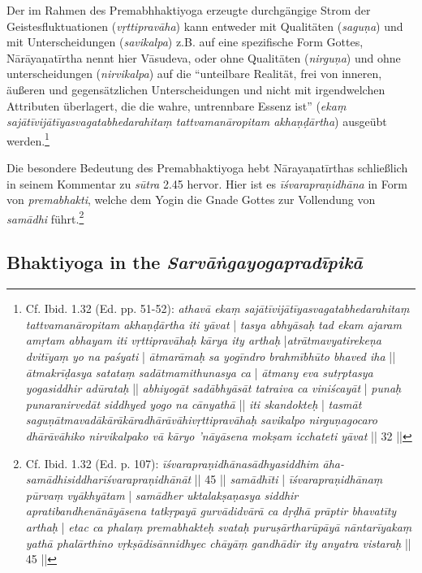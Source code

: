 Der im Rahmen des Premabhhaktiyoga erzeugte durchgängige Strom der Geistesfluktuationen (\textit{vṛttipravāha}) kann entweder mit Qualitäten (\textit{saguṇa}) und mit Unterscheidungen (\textit{savikalpa}) z.B. auf eine spezifische Form Gottes, Nārāyaṇatīrtha nennt hier Vāsudeva, oder ohne Qualitäten (\textit{nirguṇa}) und ohne unterscheidungen (\textit{nirvikalpa}) auf die ``unteilbare Realität, frei von inneren, äußeren und gegensätzlichen Unterscheidungen und nicht mit irgendwelchen Attributen überlagert, die die wahre, untrennbare Essenz ist'' (\textit{ekaṃ sajātīvijātīyasvagatabhedarahitaṃ tattvamanāropitam akhaṇḍārtha}) ausgeübt werden.\footnote{Cf. Ibid. 1.32 (Ed. pp. 51-52): \textit{athavā ekaṃ sajātīvijātīyasvagatabhedarahitaṃ tattvamanāropitam akhaṇḍārtha iti yāvat} | \textit{tasya abhyāsaḥ tad ekam ajaram amṛtam abhayam iti vṛttipravāhaḥ kārya ity arthaḥ} |\textit{atrātmavyatirekeṇa dvitīyaṃ yo na paśyati} | \textit{ātmarāmaḥ sa yogīndro brahmībhūto bhaved iha} || \textit{ātmakrīḍasya satataṃ sadātmamithunasya ca} | \textit{ātmany eva sutṛptasya yogasiddhir adūrataḥ} || \textit{abhiyogāt sadābhyāsāt tatraiva ca viniścayāt} | \textit{punaḥ punaranirvedāt siddhyed yogo na cānyathā} || \textit{iti skandokteḥ} | \textit{tasmāt saguṇātmavadākārākāradhārāvāhivṛttipravāhaḥ savikalpo nirguṇagocaro dhārāvāhiko nirvikalpako vā kāryo 'nāyāsena mokṣam icchateti yāvat} || 32 ||}

Die besondere Bedeutung des Premabhaktiyoga hebt Nārayaṇatīrthas schließlich in seinem Kommentar zu \textit{sūtra} 2.45 hervor. Hier ist es \textit{īśvarapraṇidhāna} in Form von \textit{premabhakti}, welche dem Yogin die Gnade Gottes zur Vollendung von \textit{samādhi} führt.\footnote{Cf. Ibid. 1.32 (Ed. p. 107): \textit{īśvarapraṇidhānasādhyasiddhim āha- samādhisiddharīśvarapraṇidhānāt} || 45 || \textit{samādhīti} | \textit{īśvarapraṇidhānaṃ pūrvaṃ vyākhyātam} | \textit{samādher uktalakṣaṇasya siddhir apratibandhenānāyāsena tatkṛpayā gurvādidvārā ca dṛḍhā prāptir bhavatīty arthaḥ} | \textit{etac ca phalaṃ premabhakteḥ svataḥ puruṣārtharūpāyā nāntarīyakaṃ yathā phalārthino vṛkṣādisānnidhyec chāyāṃ gandhādir ity anyatra vistaraḥ} || 45 ||}  

\subsection{Bhaktiyoga in the \emph{Sarvāṅgayogapradīpikā}}

